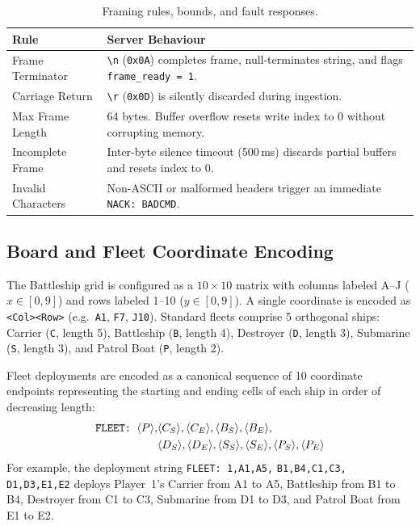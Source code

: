 \begin{table}[t]
\centering
\caption{Framing rules, bounds, and fault responses.}
\label{tab:framing}
\footnotesize
\begin{tabular}{@{}L{2.8cm}L{5.2cm}@{}}
\toprule
Rule & Server Behaviour \\
\midrule
Frame Terminator & \texttt{\textbackslash n} (\texttt{0x0A}) completes frame, null-terminates string, and flags \texttt{frame\_ready = 1}. \\
Carriage Return & \texttt{\textbackslash r} (\texttt{0x0D}) is silently discarded during ingestion. \\
Max Frame Length & 64 bytes. Buffer overflow resets write index to 0 without corrupting memory. \\
Incomplete Frame & Inter-byte silence timeout (500\,ms) discards partial buffers and resets index to 0. \\
Invalid Characters & Non-ASCII or malformed headers trigger an immediate \texttt{NACK: BADCMD}. \\
\bottomrule
\end{tabular}
\end{table}

\subsection{Board and Fleet Coordinate Encoding}
The Battleship grid is configured as a $10 \times 10$ matrix with columns labeled A--J ($x \in [0, 9]$) and rows labeled 1--10 ($y \in [0, 9]$). A single coordinate is encoded as \texttt{<Col><Row>} (e.g.\ \texttt{A1}, \texttt{F7}, \texttt{J10}). Standard fleets comprise 5 orthogonal ships: Carrier (\texttt{C}, length 5), Battleship (\texttt{B}, length 4), Destroyer (\texttt{D}, length 3), Submarine (\texttt{S}, length 3), and Patrol Boat (\texttt{P}, length 2).

Fleet deployments are encoded as a canonical sequence of 10 coordinate endpoints representing the starting and ending cells of each ship in order of decreasing length:
\begin{align}
\label{eq:fleet_str}
\text{\texttt{FLEET: }} \langle P\rangle,&\langle C_S\rangle,\langle C_E\rangle,\langle B_S\rangle,\langle B_E\rangle, \nonumber\\
&\langle D_S\rangle,\langle D_E\rangle,\langle S_S\rangle,\langle S_E\rangle,\langle P_S\rangle,\langle P_E\rangle
\end{align}
For example, the deployment string \texttt{FLEET:~1,A1,A5,} \texttt{B1,B4,C1,C3,} \texttt{D1,D3,E1,E2} deploys Player~1's Carrier from A1 to A5, Battleship from B1 to B4, Destroyer from C1 to C3, Submarine from D1 to D3, and Patrol Boat from E1 to E2. 

